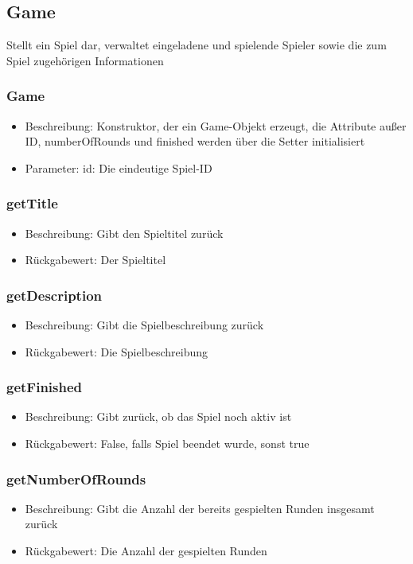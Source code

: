 \documentclass[a4paper]{scrreprt}
\begin{document}
	\subsection{Game}
	Stellt ein Spiel dar, verwaltet eingeladene und spielende Spieler sowie die zum Spiel zugehörigen Informationen
	\subsubsection{Game}
	\begin{itemize}
		\item Beschreibung: Konstruktor, der ein Game-Objekt erzeugt, die Attribute außer ID, numberOfRounds und finished werden über die Setter initialisiert
		\item Parameter: id: Die eindeutige Spiel-ID
	\end{itemize}

	\subsubsection{getTitle}
	\begin{itemize}
		\item Beschreibung: Gibt den Spieltitel zurück
		\item Rückgabewert: Der Spieltitel
	\end{itemize}
	\subsubsection{getDescription}
	\begin{itemize}
		\item Beschreibung: Gibt die Spielbeschreibung zurück
		\item Rückgabewert: Die Spielbeschreibung
	\end{itemize}
	\subsubsection{getFinished}
	\begin{itemize}
		\item Beschreibung: Gibt zurück, ob das Spiel noch aktiv ist
		\item Rückgabewert: False, falls Spiel beendet wurde, sonst true
	\end{itemize}
	\subsubsection{getNumberOfRounds}
	\begin{itemize}
		\item Beschreibung: Gibt die Anzahl der bereits gespielten Runden insgesamt zurück
		\item Rückgabewert: Die Anzahl der gespielten Runden
	\end{itemize}
\end{document}
